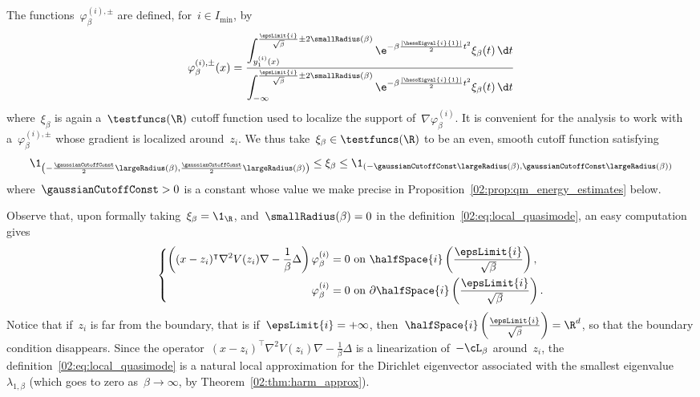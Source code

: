             The functions~$\varphi_\beta^{(i),\pm}$ are defined, for~$i\in I_{\min}$, by
            \begin{equation}
                \label{02:eq:local_quasimode}
                \varphi_\beta^{(i),\pm}(x) = \frac{\displaystyle\int_{y_1^{(i)}(x)}^{\frac{\epsLimit{i}}{\sqrt\beta}\pm 2\smallRadius(\beta)}\e^{-\beta \frac{|\hessEigval{i}{1}|}{2}t^2} \xi_\beta(t)\,\d t}{\displaystyle\int_{-\infty}^{\frac{\epsLimit{i}}{\sqrt\beta}\pm2\smallRadius(\beta)} \e^{-\beta\frac{|\hessEigval{i}{1}|}{2}t^2} \xi_\beta(t)\,\d t}%
            \end{equation}
            where~$\xi_\beta$ is again a~$\testfuncs(\R)$ cutoff function used to localize the support of~$\nabla\varphi_\beta^{(i)}$.
            It is convenient for the analysis to work with a~$\varphi_\beta^{(i),\pm}$ whose gradient is localized around~$z_i$. We thus take~$\xi_\beta\in\testfuncs(\R)$ to be an even, smooth cutoff function satisfying
            \begin{equation}
                \label{02:eq:local_quasimode_cutoff_support}
                \1_{\left(-\frac{\gaussianCutoffConst}2\largeRadius(\beta),\frac{\gaussianCutoffConst}2\largeRadius(\beta)\right)}\leq \xi_\beta\leq \1_{\left(-\gaussianCutoffConst\largeRadius(\beta),\gaussianCutoffConst\largeRadius(\beta)\right)}
            \end{equation}
            where~$\gaussianCutoffConst>0$ is a constant whose value we make precise in Proposition~\ref{02:prop:qm_energy_estimates} below. 

            Observe that, upon formally taking~$\xi_\beta = \1_\R$, and~$\smallRadius(\beta)=0$ in the definition~\eqref{02:eq:local_quasimode}, an easy computation gives
            \[\left\{\begin{aligned}\left((x-z_i)^\intercal\nabla^2 V(z_i)\nabla - \frac1\beta \Delta\right)\varphi_\beta^{(i)} &= 0\text{ on }\halfSpace{i}\left(\frac{\epsLimit{i}}{\sqrt\beta}\right),\\
            \varphi_\beta^{(i)} &= 0\text{ on }\partial\halfSpace{i}\left(\frac{\epsLimit{i}}{\sqrt\beta}\right). \end{aligned}\right.\]
            Notice that if~$z_i$ is far from the boundary, that is if~$\epsLimit{i} = +\infty$, then~$\halfSpace{i}\left(\frac{\epsLimit{i}}{\sqrt\beta}\right) = \R^d$, so that the boundary condition disappears.    
            Since the operator~$(x-z_i)^\intercal\nabla^2 V(z_i)\nabla - \frac1\beta \Delta$ is a linearization of~$-\cL_\beta$ around~$z_i$, the definition~\eqref{02:eq:local_quasimode} is a natural local approximation for the Dirichlet eigenvector associated with the smallest eigenvalue~$\lambda_{1,\beta}$ (which goes to zero as~$\beta\to\infty$, by Theorem~\ref{02:thm:harm_approx}).


